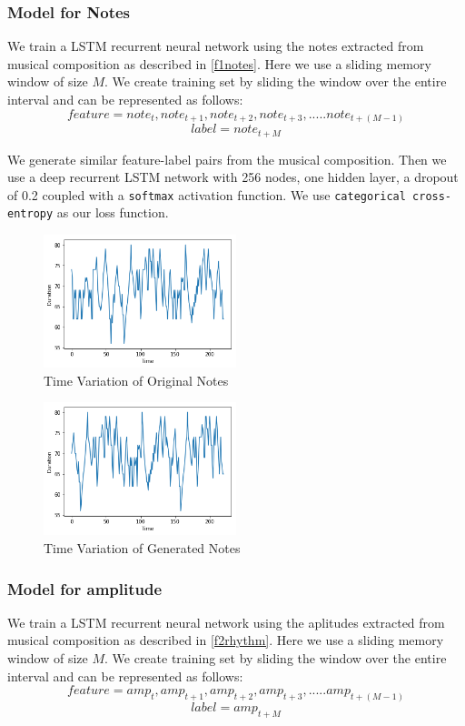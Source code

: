\documentclass[conference]{IEEEtran}
\begin{document}
\subsubsection{Model for Notes}
We train a LSTM recurrent neural network using the notes extracted from musical composition as described in \ref{f1notes}. Here we use a sliding memory window of size $M$. We create training set by sliding the window over the entire interval and can be represented as follows:
$$feature = {note_{t},note_{t+1},note_{t+2},note_{t+3},.....note_{t+(M-1)}}$$
$$label = {note_{t+M}}$$

We generate similar feature-label pairs from the musical composition. Then we use a deep recurrent LSTM network with 256 nodes, one hidden layer, a dropout of 0.2 coupled with a \texttt{softmax} activation function. We use \texttt{categorical cross-entropy} as our loss function.\\

\begin{figure}[h]
\includegraphics[width=0.5\textwidth]{IEEEtran/notes_o.png}
\caption{Time Variation of Original Notes}
\label{fig:figure1}
\end{figure}

\begin{figure}[h]
\includegraphics[width=0.5\textwidth]{IEEEtran/notes_g.png}
\caption{Time Variation of Generated Notes}
\label{fig:figure2}
\end{figure}

\subsubsection{Model for amplitude}
We train a LSTM recurrent neural network using the aplitudes extracted from musical composition as described in \ref{f2rhythm}. Here we use a sliding memory window of size $M$. We create training set by sliding the window over the entire interval and can be represented as follows:
$$feature = {amp_{t},amp_{t+1},amp_{t+2},amp_{t+3},.....amp_{t+(M-1)}}$$
$$label = {amp_{t+M}}$$
\end{document}
